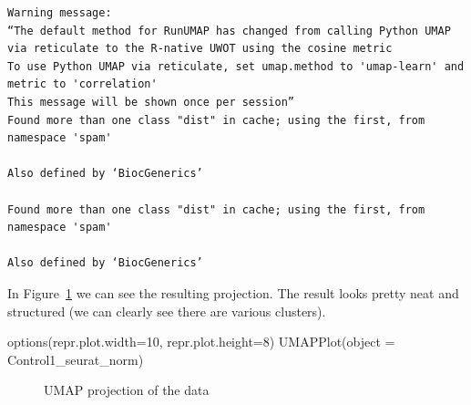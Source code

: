 \documentclass[
  letterpaper,
  DIV=11,
  numbers=noendperiod]{scrartcl}
\newenvironment{Shaded}{}{}
\newcommand{\AttributeTok}[1]{\textcolor[rgb]{0.49,0.56,0.16}{#1}}
\newcommand{\DecValTok}[1]{\textcolor[rgb]{0.25,0.63,0.44}{#1}}
\newcommand{\FunctionTok}[1]{\textcolor[rgb]{0.02,0.16,0.49}{#1}}
\newcommand{\NormalTok}[1]{#1}
\begin{document}
\begin{verbatim}
Warning message:
“The default method for RunUMAP has changed from calling Python UMAP via reticulate to the R-native UWOT using the cosine metric
To use Python UMAP via reticulate, set umap.method to 'umap-learn' and metric to 'correlation'
This message will be shown once per session”
Found more than one class "dist" in cache; using the first, from namespace 'spam'

Also defined by ‘BiocGenerics’

Found more than one class "dist" in cache; using the first, from namespace 'spam'

Also defined by ‘BiocGenerics’
\end{verbatim}

In Figure~\ref{fig-umap} we can see the resulting projection. The result
looks pretty neat and structured (we can clearly see there are various
clusters).

\begin{Shaded}
\begin{Highlighting}[]
\FunctionTok{options}\NormalTok{(}\AttributeTok{repr.plot.width=}\DecValTok{10}\NormalTok{, }\AttributeTok{repr.plot.height=}\DecValTok{8}\NormalTok{)}
\FunctionTok{UMAPPlot}\NormalTok{(}\AttributeTok{object =}\NormalTok{ Control1\_seurat\_norm)}
\end{Highlighting}
\end{Shaded}

\begin{figure}[H]


\caption{\label{fig-umap}UMAP projection of the data}

\end{figure}%
\end{document}
